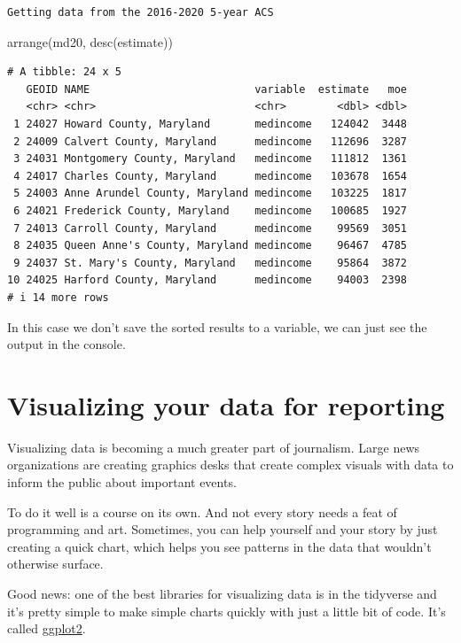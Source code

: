 \documentclass[
  letterpaper,
  DIV=11,
  numbers=noendperiod]{scrreprt}
\newenvironment{Shaded}{\begin{snugshade}}{\end{snugshade}}
\newcommand{\FunctionTok}[1]{\textcolor[rgb]{0.28,0.35,0.67}{#1}}
\newcommand{\NormalTok}[1]{\textcolor[rgb]{0.00,0.23,0.31}{#1}}
\begin{document}
\begin{verbatim}
Getting data from the 2016-2020 5-year ACS
\end{verbatim}

\begin{Shaded}
\begin{Highlighting}[]
\FunctionTok{arrange}\NormalTok{(md20, }\FunctionTok{desc}\NormalTok{(estimate))}
\end{Highlighting}
\end{Shaded}

\begin{verbatim}
# A tibble: 24 x 5
   GEOID NAME                          variable  estimate   moe
   <chr> <chr>                         <chr>        <dbl> <dbl>
 1 24027 Howard County, Maryland       medincome   124042  3448
 2 24009 Calvert County, Maryland      medincome   112696  3287
 3 24031 Montgomery County, Maryland   medincome   111812  1361
 4 24017 Charles County, Maryland      medincome   103678  1654
 5 24003 Anne Arundel County, Maryland medincome   103225  1817
 6 24021 Frederick County, Maryland    medincome   100685  1927
 7 24013 Carroll County, Maryland      medincome    99569  3051
 8 24035 Queen Anne's County, Maryland medincome    96467  4785
 9 24037 St. Mary's County, Maryland   medincome    95864  3872
10 24025 Harford County, Maryland      medincome    94003  2398
# i 14 more rows
\end{verbatim}

In this case we don't save the sorted results to a variable, we can just
see the output in the console.


\hypertarget{visualizing-your-data-for-reporting}{%
\chapter{Visualizing your data for
reporting}\label{visualizing-your-data-for-reporting}}

Visualizing data is becoming a much greater part of journalism. Large
news organizations are creating graphics desks that create complex
visuals with data to inform the public about important events.

To do it well is a course on its own. And not every story needs a feat
of programming and art. Sometimes, you can help yourself and your story
by just creating a quick chart, which helps you see patterns in the data
that wouldn't otherwise surface.

Good news: one of the best libraries for visualizing data is in the
tidyverse and it's pretty simple to make simple charts quickly with just
a little bit of code. It's called
\href{https://ggplot2.tidyverse.org/}{ggplot2}.
\end{document}
